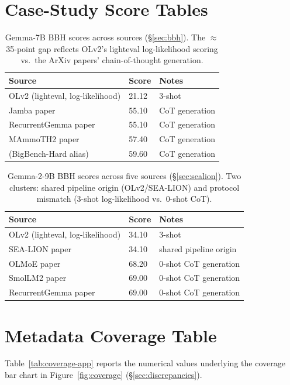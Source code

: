 \documentclass[11pt]{article}
\begin{document}
\section{Case-Study Score Tables}
\label{app:casetables}

\begin{table}[ht]
\centering
\small
\begin{tabular}{lll}
\toprule
Source & Score & Notes \\
\midrule
OLv2 (lighteval, log-likelihood) & 21.12 & 3-shot \\
Jamba paper & 55.10 & CoT generation \\
RecurrentGemma paper & 55.10 & CoT generation \\
MAmmoTH2 paper & 57.40 & CoT generation \\
(BigBench-Hard alias) & 59.60 & CoT generation \\
\bottomrule
\end{tabular}
\caption{Gemma-7B BBH scores across sources (\S\ref{sec:bbh}). The
$\approx$35-point gap reflects OLv2's lighteval log-likelihood scoring
vs.\ the ArXiv papers' chain-of-thought generation. }
\label{tab:bbh-app}
\end{table}

\begin{table}[ht]
\centering
\small
\begin{tabular}{lll}
\toprule
Source & Score & Notes \\
\midrule
OLv2 (lighteval, log-likelihood) & 34.10 & 3-shot \\
SEA-LION paper & 34.10 & shared pipeline origin \\
OLMoE paper & 68.20 & 0-shot CoT generation \\
SmolLM2 paper & 69.00 & 0-shot CoT generation \\
RecurrentGemma paper & 69.00 & 0-shot CoT generation \\
\bottomrule
\end{tabular}
\caption{Gemma-2-9B BBH scores across five sources (\S\ref{sec:sealion}).
Two clusters: shared pipeline origin (OLv2/SEA-LION) and protocol mismatch
(3-shot log-likelihood vs.\ 0-shot CoT).}
\label{tab:sealion-app}
\end{table}


\section{Metadata Coverage Table}
\label{app:coverage}

Table~\ref{tab:coverage-app} reports the numerical values underlying the
coverage bar chart in Figure~\ref{fig:coverage} (\S\ref{sec:discrepancies}).
\end{document}

